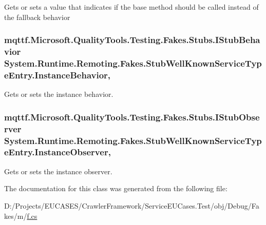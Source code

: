 Gets or sets a value that indicates if the base method should be called instead of the fallback behavior

\hypertarget{class_system_1_1_runtime_1_1_remoting_1_1_fakes_1_1_stub_well_known_service_type_entry_aade3330acdd2ec615fec58502ca67e4e}{
\subsubsection[{Instance\-Behavior}]{\setlength{\rightskip}{0pt plus 5cm}mqttf.\-Microsoft.\-Quality\-Tools.\-Testing.\-Fakes.\-Stubs.\-I\-Stub\-Behavior System.\-Runtime.\-Remoting.\-Fakes.\-Stub\-Well\-Known\-Service\-Type\-Entry.\-Instance\-Behavior\hspace{0.3cm}{\ttfamily [get]}, {\ttfamily [set]}}}\label{class_system_1_1_runtime_1_1_remoting_1_1_fakes_1_1_stub_well_known_service_type_entry_aade3330acdd2ec615fec58502ca67e4e}


Gets or sets the instance behavior.

\hypertarget{class_system_1_1_runtime_1_1_remoting_1_1_fakes_1_1_stub_well_known_service_type_entry_a8ba16ca769ec1b9ec028127898d483db}{
\subsubsection[{Instance\-Observer}]{\setlength{\rightskip}{0pt plus 5cm}mqttf.\-Microsoft.\-Quality\-Tools.\-Testing.\-Fakes.\-Stubs.\-I\-Stub\-Observer System.\-Runtime.\-Remoting.\-Fakes.\-Stub\-Well\-Known\-Service\-Type\-Entry.\-Instance\-Observer\hspace{0.3cm}{\ttfamily [get]}, {\ttfamily [set]}}}\label{class_system_1_1_runtime_1_1_remoting_1_1_fakes_1_1_stub_well_known_service_type_entry_a8ba16ca769ec1b9ec028127898d483db}


Gets or sets the instance observer.



The documentation for this class was generated from the following file\-:\begin{DoxyCompactItemize}
\item 
D\-:/\-Projects/\-E\-U\-C\-A\-S\-E\-S/\-Crawler\-Framework/\-Service\-E\-U\-Cases.\-Test/obj/\-Debug/\-Fakes/m/\hyperlink{m_2f_8cs}{f.\-cs}\end{DoxyCompactItemize}
